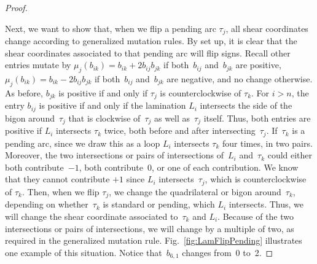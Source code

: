 \documentclass[pdftex]{sigma}%
\numberwithin{equation}{section}
\begin{document}
\begin{proof}
\begin{center}
\end{center}

Next, we want to show that, when we flip a pending arc $\tau_j$, all shear coordinates change according to generalized mutation rules. By set up, it is clear that the shear coordinates associated to that pending arc will flip signs. Recall other entries mutate by $\mu_j(b_{ik}) = b_{ik} + 2 b_{ij} b_{jk}$ if both~$b_{ij}$ and~$b_{jk}$ are positive, $\mu_j(b_{ik}) = b_{ik} - 2 b_{ij} b_{jk}$ if both~$b_{ij}$ and~$b_{jk}$ are negative, and no change otherwise. As before, $b_{jk}$ is positive if and only if $\tau_j$ is counterclockwise of $\tau_k$. For $i > n$, the entry $b_{ij}$ is positive if and only if the lamination $L_i$ intersects the side of the bigon around~$\tau_j$ that is clockwise of~$\tau_j$ as well as~$\tau_j$ itself. Thus, both entries are positive if $L_i$ intersects $\tau_k$ twice, both before and after intersecting~$\tau_j$. If~$\tau_k$ is a pending arc, since we draw this as a loop $L_i$ intersects $\tau_k$ four times, in two pairs. Moreover, the two intersections or pairs of intersections of~$L_i$ and~$\tau_k$ could either both contribute~$-1$, both contribute~0, or one of each contribution. We know that they cannot contribute $+1$ since $L_i$ intersects~$\tau_j$, which is counterclockwise of $\tau_k$. Then, when we flip $\tau_j$, we change the quadrilateral or bigon around~$\tau_k$, depending on whether~$\tau_k$ is standard or pending, which $L_i$ intersects. Thus, we will change the shear coordinate associated to~$\tau_k$ and $L_i$. Because of the two intersections or pairs of intersections, we will change by a multiple of two, as required in the generalized mutation rule.
Fig.~\ref{fig:LamFlipPending} illustrates one example of this situation. Notice that~$b_{6,1}$ changes from~0 to~2.
\end{proof}
\end{document}
